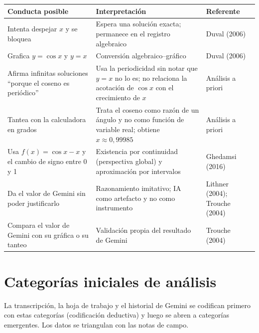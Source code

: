 \documentclass[11pt,letterpaper]{article}
\begin{document}
\begin{center}
\small
\renewcommand{\arraystretch}{1.25}
\begin{tabularx}{\linewidth}{@{}p{4.4cm}Lp{2.8cm}@{}}
\toprule
\textbf{Conducta posible} & \textbf{Interpretación} & \textbf{Referente}\\
\midrule
Intenta despejar $x$ y se bloquea & Espera una solución exacta; permanece en el registro algebraico & Duval (2006)\\
Grafica $y=\cos x$ y $y=x$ & Conversión algebraico--gráfico & Duval (2006)\\
Afirma infinitas soluciones ``porque el coseno es periódico'' & Usa la periodicidad sin notar que $y=x$ no lo es; no relaciona la acotación de $\cos x$ con el crecimiento de $x$ & Análisis a priori\\
Tantea con la calculadora en grados & Trata el coseno como razón de un ángulo y no como función de variable real; obtiene $x\approx 0{,}99985$ & Análisis a priori\\
Usa $f(x)=\cos x - x$ y el cambio de signo entre 0 y 1 & Existencia por continuidad (perspectiva global) y aproximación por intervalos & Ghedamsi (2016)\\
Da el valor de Gemini sin poder justificarlo & Razonamiento imitativo; IA como artefacto y no como instrumento & Lithner (2004); Trouche (2004)\\
Compara el valor de Gemini con su gráfica o su tanteo & Validación propia del resultado de Gemini & Trouche (2004)\\
\bottomrule
\end{tabularx}
\end{center}

\section{Categorías iniciales de análisis}

La transcripción, la hoja de trabajo y el historial de Gemini se codifican primero con estas categorías (codificación deductiva) y luego se abren a categorías emergentes. Los datos se triangulan con las notas de campo.
\end{document}
